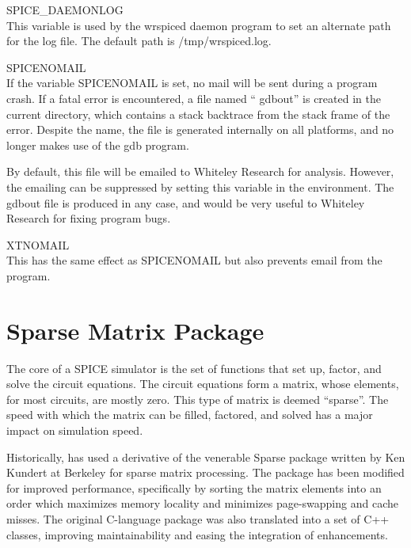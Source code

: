 \begin{description}
\item{\et SPICE\_DAEMONLOG}\\
This variable is used by the {\vt wrspiced} daemon program to set an
alternate path for the log file.  The default path is {\vt
/tmp/wrspiced.log}.

\item{\et SPICENOMAIL}\\
If the variable {\et SPICENOMAIL} is set, no mail will be sent during
a program crash.  If a fatal error is encountered, a file named ``{\vt
gdbout}'' is created in the current directory, which contains a stack
backtrace from the stack frame of the error.  Despite the name, the
file is generated internally on all platforms, and no longer makes use
of the {\vt gdb} program.

By default, this file will be emailed to Whiteley Research for
analysis.  However, the emailing can be suppressed by setting this
variable in the environment.  The {\vt gdbout} file is produced in any
case, and would be very useful to Whiteley Research for fixing program
bugs.

\item{\et XTNOMAIL}\\
This has the same effect as {\et SPICENOMAIL} but also prevents email
from the {\Xic} program.
\end{description}


\section{Sparse Matrix Package}


The core of a SPICE simulator is the set of functions that set up,
factor, and solve the circuit equations.  The circuit equations form a
matrix, whose elements, for most circuits, are mostly zero.  This type
of matrix is deemed ``sparse''.  The speed with which the matrix can
be filled, factored, and solved has a major impact on simulation
speed.

Historically, {\WRspice} has used a derivative of the venerable Sparse
package written by Ken Kundert at Berkeley for sparse matrix
processing.  The package has been modified for improved performance,
specifically by sorting the matrix elements into an order which
maximizes memory locality and minimizes page-swapping and cache
misses.  The original C-language package was also translated into a
set of C++ classes, improving maintainability and easing the
integration of enhancements.


